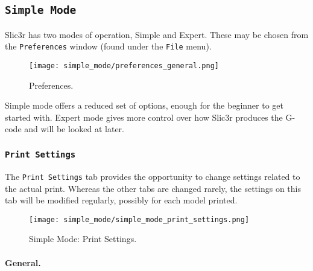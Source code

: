 \subsection{\texttt{Simple Mode}} %
\label{sec:simple_mode}

Slic3r has two modes of operation, Simple and Expert. These may be chosen from the \texttt{Preferences} window (found under the \texttt{File} menu).

\begin{figure}[ht]
\centering
\texttt{[image: simple\_mode/preferences\_general.png]}
\caption{Preferences.}
\label{fig:preferences_general}
\end{figure}

Simple mode offers a reduced set of options, enough for the beginner to get started with.  Expert mode gives more control over how Slic3r produces the G-code and will be looked at later.

\subsubsection{\texttt{Print Settings}}

The \texttt{Print Settings} tab provides the opportunity to change settings related to the actual print.  Whereas the other tabs are changed rarely, the settings on this tab will be modified regularly, possibly for each model printed.

\begin{figure}[ht]
\centering
\texttt{[image: simple\_mode/simple\_mode\_print\_settings.png]}
\caption{Simple Mode: Print Settings.}
\label{fig:simple_mode_print_settings}
\end{figure}

\paragraph{General.} %
\label{par:simple_general}

